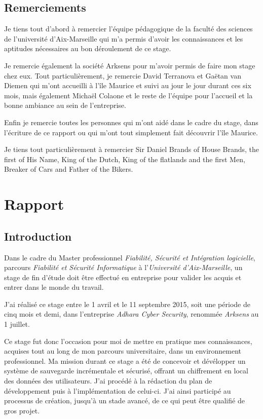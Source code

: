 \documentclass[a4paper,10pt, twoside]{report}
\begin{document}
\begin{spacing}{1.2}
\begin{abstract}
\end{abstract}

\chapter*{Remerciements}
\thispagestyle{fancy}
Je tiens tout d'abord à remercier l'équipe pédagogique de la faculté des
sciences de l'université d'Aix-Marseille qui m'a permis d'avoir les
connaissances et les aptitudes nécessaires au bon déroulement de ce stage.

Je remercie également la société Arksens pour m'avoir permis de faire mon
stage chez eux. Tout particulièrement, je remercie David Terranova et Gaëtan
van Diemen qui m'ont accueilli à l'île Maurice et suivi au jour le jour
durant ces six mois, mais également Michaël Colaone et le reste de
l'équipe pour l'accueil et la bonne ambiance au sein de l'entreprise.

Enfin je remercie toutes les personnes qui m'ont aidé dans le cadre du stage,
dans l'écriture de ce rapport ou qui m'ont tout simplement fait découvrir
l'île Maurice.

Je tiens tout particulièrement à remercier Sir Daniel Brands of House Brands,
the first of His Name, King of the Dutch, King of the flatlands and the first
Men, Breaker of Cars and Father of the Bikers.

\clearpage
\pagestyle{fancy}
\tableofcontents
\clearpage

\part{Rapport}
\thispagestyle{empty}
\chapter{Introduction}
\thispagestyle{fancy}
Dans le cadre du Master professionnel \textit{Fiabilité, Sécurité et
Intégration logicielle}, parcours \textit{Fiabilité et Sécurité
Informatique} à l'\textit{Université d'Aix-Marseille}, un stage de fin
d'étude doit être effectué en entreprise pour valider les acquis et
entrer dans le monde du travail.

J'ai réalisé ce stage entre le 1 avril et le 11 septembre 2015, soit
une période de cinq mois et demi, dans l'entreprise \textit{Adhara Cyber
Security}, renommée \textit{Arksens} au 1 juillet.

Ce stage fut donc l'occasion pour moi de mettre en pratique mes connaissances,
acquises tout au long de mon parcours universitaire, dans un environnement
professionnel. Ma mission durant ce stage a été de concevoir et dévélopper un
système de sauvegarde incrémentale et sécurisé, offrant un chiffrement en local
des données des utilisateurs. J'ai procédé à la rédaction du plan de
développement puis à l'implémentation de celui-ci. J'ai ainsi participé au
processus de création, jusqu'à un stade avancé, de ce qui peut être qualifié
de gros projet.


\end{spacing}
\end{document}
